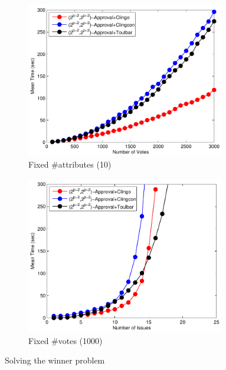 {
	\begin{figure}
		\centering
    \begin{subfigure}[b]{0.45\textwidth}
			\centering
			\includegraphics[width=0.95\textwidth]{figs/LPTrees/win/2kAppFISCICP.pdf}
			\caption{Fixed \#attributes (10)}
		\end{subfigure}
    \begin{subfigure}[b]{0.45\textwidth}
			\centering
			\includegraphics[width=0.95\textwidth]{figs/LPTrees/win/2kAppFVSCICP.pdf}
			\caption{Fixed \#votes (1000)}
		\end{subfigure}
		\caption{Solving the winner problem}
	\end{figure}
}

